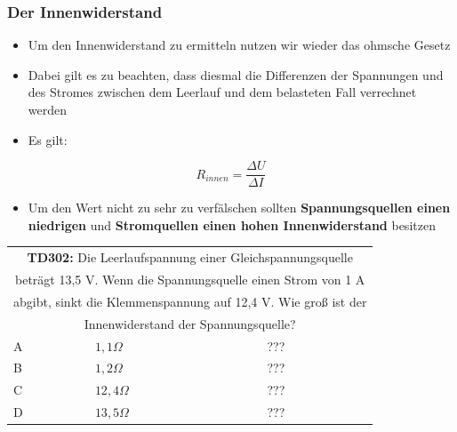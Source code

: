 \begin{frame}
	\frametitle{Der Innenwiderstand}
	\begin{itemize}
		\item	Um den Innenwiderstand zu ermitteln nutzen wir wieder das ohmsche Gesetz
		\item	Dabei gilt es zu beachten, dass diesmal die Differenzen der Spannungen und des Stromes zwischen dem Leerlauf und dem belasteten Fall verrechnet werden
		\item	Es gilt:
	\end{itemize}
	\begin{equation}
		R_{innen} = \frac{\Delta U}{\Delta I}
	\end{equation}
	\begin{itemize}
		\item Um den Wert nicht zu sehr zu verfälschen sollten \textbf{Spannungsquellen einen niedrigen} und \textbf{Stromquellen einen hohen Innenwiderstand} besitzen
	\end{itemize}
\end{frame}

\begin{frame}
	\begin{small}	
	\begin{tabular}{|l|l|l|}
	\hline
		\multicolumn{3}{|c|}{\textbf{TD302:} Die Leerlaufspannung einer Gleichspannungsquelle}\\
		\multicolumn{3}{|c|}{beträgt 13,5 V. Wenn die Spannungsquelle einen Strom von 1 A}\\
		\multicolumn{3}{|c|}{abgibt, sinkt die Klemmenspannung auf 12,4 V. Wie groß ist der}\\			\multicolumn{3}{|c|}{Innenwiderstand der Spannungsquelle?}\\
		\hline
		A & $1,1 \Omega$ & ??? \\ \hline
		B & $1,2 \Omega$ & ??? \\ \hline
		C & $12,4 \Omega$ & ??? \\ \hline
		D & $13,5 \Omega$ & ??? \\ \hline 		
	\end{tabular}
	\end{small}
\end{frame}

